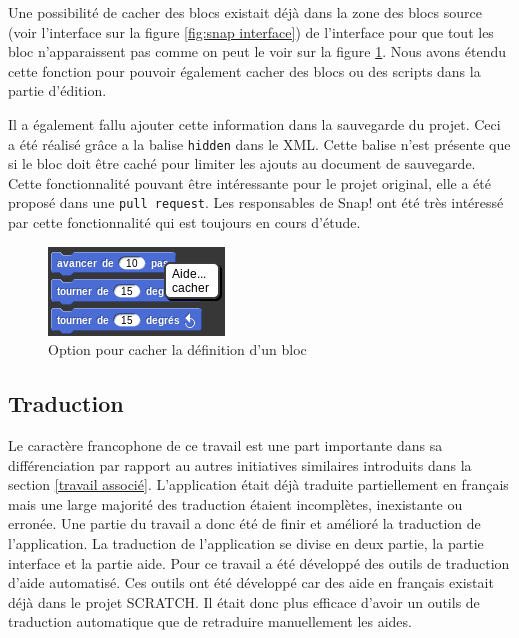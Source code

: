 Une possibilité de cacher des blocs existait déjà dans la zone des blocs source (voir l'interface sur la figure \ref{fig:snap interface}) de l'interface pour que tout les bloc n'apparaissent pas comme on peut le voir sur la figure \ref{fig:cacher}. Nous avons étendu cette fonction pour pouvoir également cacher des blocs ou des scripts dans la partie d'édition.

Il a également fallu ajouter cette information dans la sauvegarde du projet. Ceci a été réalisé grâce a la balise \texttt{hidden} dans le XML. Cette balise n'est présente que si le bloc doit être caché pour limiter les ajouts au document de sauvegarde.\\

Cette fonctionnalité pouvant être intéressante pour le projet original, elle a été proposé dans une \texttt{pull request}. Les responsables de Snap! ont été très intéressé par cette fonctionnalité qui est toujours en cours d'étude.
\begin{figure}[ht]
  \begin{center}
    \includegraphics[scale=0.5]{content/7-solution/2-snap/images/cacher}
    \caption{Option pour cacher la définition d'un bloc}
    \label{fig:cacher}
  \end{center}
\end{figure}

\subsection{Traduction}
Le caractère francophone de ce travail est une part importante dans sa différenciation par rapport au autres initiatives similaires introduits dans la section \ref{travail associé}. L'application était déjà traduite partiellement en français mais une large majorité des traduction étaient incomplètes, inexistante ou erronée. Une partie du travail a donc été de finir et amélioré la traduction de l'application. La traduction de l'application se divise en deux partie, la partie interface et la partie aide. Pour ce travail a été développé des outils de traduction d'aide automatisé. Ces outils ont été développé car des aide en français existait déjà dans le projet SCRATCH. Il était donc plus efficace d'avoir un outils de traduction automatique que de retraduire manuellement les aides.

